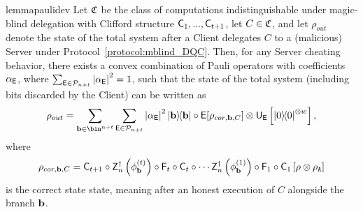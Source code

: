 \begin{restatable}{lemma}{paulidev}
    \label{lemma:mblind:Pauli deviations}
    Let $\mathfrak C$ be the class of computations indistinguishable under magic-blind delegation with Clifford structure $\mathsf{C}_{1}, ..., \mathsf{C}_{t+1}$, let  $C\in \mathfrak C$, and let $\rho_{out}$ denote the state of the total system after a Client delegates $C$ to a (malicious) Server under Protocol~\ref{protocol:mblind_DQC}. Then, for any Server cheating behavior, there exists a convex combination of Pauli operators with coefficients $\alpha_{\mathsf{E}}$, where $\sum_{\mathsf{E}\in\mathcal{P}_{n+t}}\abs{\alpha_{\mathsf{E}}}^2=1$, such that the state of the total system (including bits discarded by the Client) can be written as
    \begin{equation}
        \rho_{out}
        =
        \sum_{\b\in\bin^{n+t}}
        \sum_{\E\in\Pauli_{n+t}}
        \abs{\alpha_\E}^2
        \ketbra\b
        \circ
        \E
        [
            \rho_{cor, \b, C}
        ]
        \otimes \U_\E\left[
            \ketbra0^{\otimes w}
            \right],
    \end{equation}
    where
    \begin{equation}
        \rho_{cor, \mathbf b, C}
        =
        \mathsf{C}_{t+1}
        \circ
        \mathsf{Z}_n^\dagger\left(\phi_\mathbf b^{(t)}\right)
        \circ
        \mathsf{F}_{t}
        \circ
        \mathsf{C}_{t}
        \circ
        \cdots
        \mathsf{Z}_n^\dagger\left(\phi_\mathbf b^{(1)}\right)
        \circ
        \mathsf{F}_{1}
        \circ
        \mathsf{C}_{1}
        \left[\rho \otimes \rho_{\mathtt{A}}\right]
    \end{equation}
    is the correct state state, meaning after an honest execution of $C$ alongside the branch $\mathbf b$.
\end{restatable}

